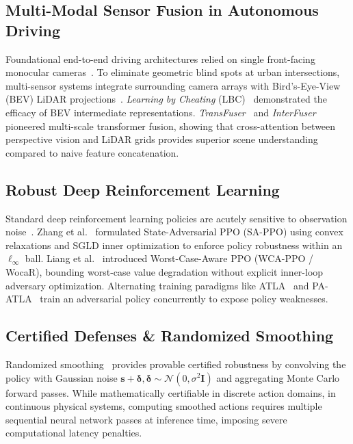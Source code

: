 \documentclass[conference]{IEEEtran}
\begin{document}
\subsection{Multi-Modal Sensor Fusion in Autonomous Driving}
Foundational end-to-end driving architectures relied on single front-facing monocular cameras~\cite{pomerleau1988, bojarski2016, codevilla2018}. To eliminate geometric blind spots at urban intersections, multi-sensor systems integrate surrounding camera arrays with Bird's-Eye-View (BEV) LiDAR projections~\cite{lang2019, bevdet2022}. \textit{Learning by Cheating} (LBC)~\cite{chen2020} demonstrated the efficacy of BEV intermediate representations. \textit{TransFuser}~\cite{transfuser2021} and \textit{InterFuser}~\cite{interfuser2022} pioneered multi-scale transformer fusion, showing that cross-attention between perspective vision and LiDAR grids provides superior scene understanding compared to naive feature concatenation.

\subsection{Robust Deep Reinforcement Learning}
Standard deep reinforcement learning policies are acutely sensitive to observation noise~\cite{schulman2017}. Zhang et al.~\cite{zhang2020sa} formulated State-Adversarial PPO (SA-PPO) using convex relaxations and SGLD inner optimization to enforce policy robustness within an $\ell_\infty$ ball. Liang et al.~\cite{liang2022wocar} introduced Worst-Case-Aware PPO (WCA-PPO / WocaR), bounding worst-case value degradation without explicit inner-loop adversary optimization. Alternating training paradigms like ATLA~\cite{zhang2021robust} and PA-ATLA~\cite{sun2021policy} train an adversarial policy concurrently to expose policy weaknesses.

\subsection{Certified Defenses \& Randomized Smoothing}
Randomized smoothing~\cite{kumar2022certifying, sun2024breaking} provides provable certified robustness by convolving the policy with Gaussian noise $\mathbf{s} + \boldsymbol{\delta}, \boldsymbol{\delta} \sim \mathcal{N}(0, \sigma^2 \mathbf{I})$ and aggregating Monte Carlo forward passes. While mathematically certifiable in discrete action domains, in continuous physical systems, computing smoothed actions requires multiple sequential neural network passes at inference time, imposing severe computational latency penalties.
\end{document}
